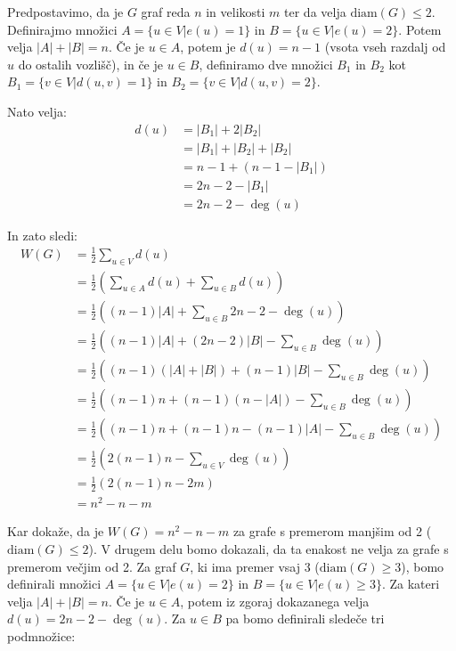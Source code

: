 \documentclass[fin1, tisk]{fmfdelo}
\begin{document}
\begin{dokaz}
Predpostavimo, da je \(G\) graf reda \(n\) in velikosti \(m\) ter da velja \(\text{diam}(G) \leq 2\). Definirajmo množici \(A = \{u \in V | e(u) = 1\}\) in \(B = \{u \in V | e(u) = 2\}\). Potem velja \(|A| + |B| = n\). Če je \(u \in A\), potem je \(d(u) = n - 1\) (vsota vseh razdalj od \(u\) do ostalih vozlišč), in če je \(u \in B\), definiramo dve množici \(B_1\) in \(B_2\) kot \(B_1 = \{v \in V | d(u, v) = 1\}\) in \(B_2 = \{v \in V | d(u, v) = 2\}\).

Nato velja:
\begin{align*}
d(u) &= |B_1| + 2|B_2| \\
&= |B_1| + |B_2| + |B_2| \\
&= n - 1 + (n - 1 - |B_1|) \\
&= 2n - 2 - |B_1| \\
&= 2n - 2 - \deg(u)
\end{align*}

In zato sledi:
\begin{align*}
W(G) &= \frac{1}{2} \sum_{u \in V} d(u) \\
&= \frac{1}{2}( \sum_{u \in A} d(u) + \sum_{u \in B} d(u)) \\
&= \frac{1}{2}( (n - 1)|A| + \sum_{u \in B} 2n - 2 - \deg(u)) \\
&= \frac{1}{2}( (n - 1)|A| + (2n - 2)|B| - \sum_{u \in B} \deg(u)) \\
&= \frac{1}{2}( (n - 1)(|A| + |B|) + (n - 1)|B| - \sum_{u \in B} \deg(u)) \\
&= \frac{1}{2}( (n - 1)n + (n - 1)(n - |A|) - \sum_{u \in B} \deg(u)) \\
&= \frac{1}{2}( (n - 1)n + (n - 1)n - (n - 1)|A| - \sum_{u \in B} \deg(u)) \\
&= \frac{1}{2}( 2(n - 1)n  - \sum_{u \in V} \deg(u)) \\
&= \frac{1}{2}( 2(n - 1)n  - 2m) \\
&= n^2 - n - m
\end{align*}

Kar dokaže, da je \(W(G) = n^2 - n - m\) za grafe s premerom manjšim od 2 (\(\text{diam}(G) \leq 2\)). V drugem delu bomo dokazali, da ta enakost ne velja za grafe s premerom večjim od 2. Za graf \(G\), ki ima premer vsaj 3 (\(\text{diam}(G) \geq 3\)), bomo definirali množici \(A = \{u \in V | e(u) = 2\}\) in \(B = \{u \in V | e(u) \geq 3\}\). Za kateri velja \(|A| + |B| = n\). Če je \(u \in A\), potem iz zgoraj dokazanega velja \(d(u) = 2n - 2 - \deg(u)\). Za \(u \in B\) pa bomo definirali sledeče tri podmnožice:


\end{dokaz}
\end{document}
